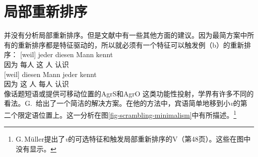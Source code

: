 \section{局部重新排序}

\citet{Adger2003a} 并没有分析局部重新排序。但是文献中有一些其他方面的建议。因为最简方案中所有的重新排序都是特征驱动的，所以就必须有一个特征可以触发例（b）的重新排序：
\eal
\ex 
\gll {}[weil] jeder diesen Mann kennt\\
	 {}\spacebr{}因为 每人 这 人 认识\\
\ex 
\gll {}[weil] diesen Mann jeder kennt\\
	 {}\spacebr{}因为 这 人 每人 认识\\
\zl
像话题短语\citep[]{Laenzlinger2004a}或提供可移动位置的AgrS和AgrO \citep[\S~4]{Meinunger2000a}这类功能性投射，学界有许多不同的看法。G.\  \citet[\S~3.5]{GMueller2014a-u}给出了一个简洁的解决方案。在他的方法中，宾语简单地移到小\emph{v}的第二个限定语位置上。这一分析在图\vref{fig-scrambling-minimalism}中有所描述。\footnote{%
G.\,Müller提出了\textit{v}的可选特征和触发局部重新排序的V（第48页）。这些在图中没有显示。
} 

